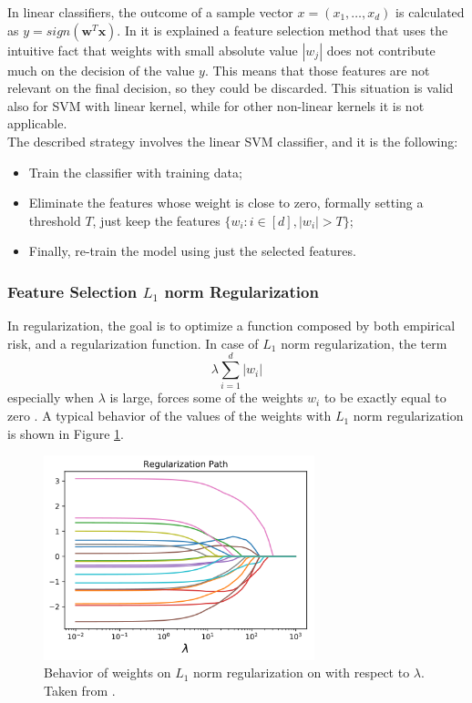 In linear classifiers, the outcome of a sample vector $x = (x_1, \dots, x_d)$ is calculated as $y=sign(\mathbf{w}^T\mathbf{x})$. In \cite{Brank2002FeatureSU} it is explained a feature selection method that uses the intuitive fact that weights with small absolute value $|w_j|$ does not contribute much on the decision of the value $y$. This means that those features are not relevant on the final decision, so they could be discarded. This situation is valid also for SVM with linear kernel, while for other non-linear kernels it is not applicable.\\
The described strategy involves the linear \ac{SVM} classifier, and it is the following:
\begin{itemize}
	\item Train the classifier with training data;
	\item Eliminate the features whose weight is close to zero, formally setting a threshold $T$, just keep the features $\{w_i : i \in [d], |w_i| > T\}$;
	\item Finally, re-train the model using just the selected features.
\end{itemize}

\subsubsection{Feature Selection $L_1$ norm Regularization}

In regularization, the goal is to optimize a function composed by both empirical risk, and a regularization function. In case of $L_1$ norm regularization, the term
\[ \lambda \sum_{i = 1}^{d} |w_i| \]
especially when $\lambda$ is large, forces some of the weights $w_i$ to be exactly equal to zero \cite{article-lasso}. A typical behavior of the values of the weights with $L_1$ norm regularization is shown in Figure \ref{fig:lasso}.

\begin{figure}[ht]
	\centering
	\includegraphics[width=0.7\textwidth]{figures/lasso2.png}
	\caption{Behavior of weights on $L_1$ norm regularization on with respect to $\lambda$. Taken from \cite{lasso}.}
	\label{fig:lasso}
\end{figure}

